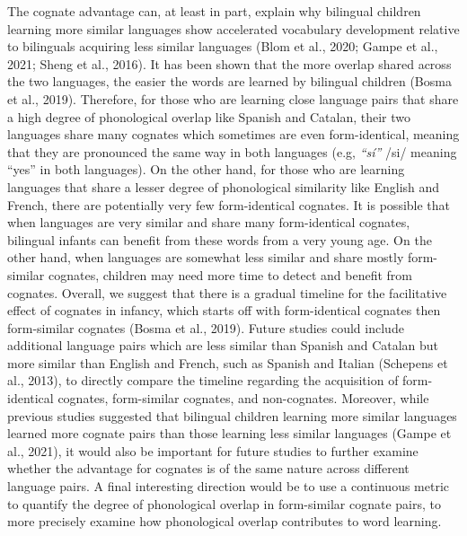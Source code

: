\documentclass[
  ,man,floatsintext]{apa6}
\begin{document}
The cognate advantage can, at least in part, explain why bilingual children learning more similar languages show accelerated vocabulary development relative to bilinguals acquiring less similar languages (Blom et al., 2020; Gampe et al., 2021; Sheng et al., 2016). It has been shown that the more overlap shared across the two languages, the easier the words are learned by bilingual children (Bosma et al., 2019). Therefore, for those who are learning close language pairs that share a high degree of phonological overlap like Spanish and Catalan, their two languages share many cognates which sometimes are even form-identical, meaning that they are pronounced the same way in both languages (e.g, \emph{``sí''} /si/ meaning ``yes'' in both languages). On the other hand, for those who are learning languages that share a lesser degree of phonological similarity like English and French, there are potentially very few form-identical cognates. It is possible that when languages are very similar and share many form-identical cognates, bilingual infants can benefit from these words from a very young age. On the other hand, when languages are somewhat less similar and share mostly form-similar cognates, children may need more time to detect and benefit from cognates. Overall, we suggest that there is a gradual timeline for the facilitative effect of cognates in infancy, which starts off with form-identical cognates then form-similar cognates (Bosma et al., 2019). Future studies could include additional language pairs which are less similar than Spanish and Catalan but more similar than English and French, such as Spanish and Italian (Schepens et al., 2013), to directly compare the timeline regarding the acquisition of form-identical cognates, form-similar cognates, and non-cognates. Moreover, while previous studies suggested that bilingual children learning more similar languages learned more cognate pairs than those learning less similar languages (Gampe et al., 2021), it would also be important for future studies to further examine whether the advantage for cognates is of the same nature across different language pairs. A final interesting direction would be to use a continuous metric to quantify the degree of phonological overlap in form-similar cognate pairs, to more precisely examine how phonological overlap contributes to word learning.
\end{document}
